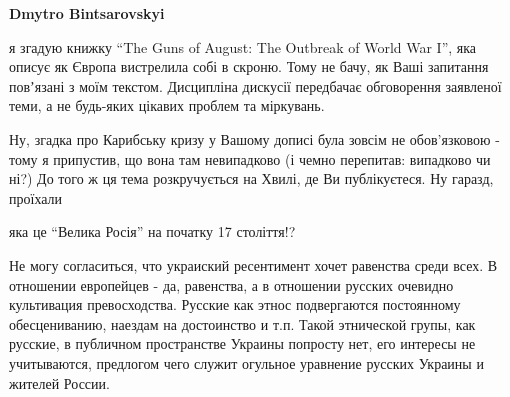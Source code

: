 \begin{itemize}
\begin{itemize} %
\textbf{Dmytro Bintsarovskyi} 

я згадую книжку \enquote{The Guns of August: The Outbreak of World War I}, яка описує
як Європа вистрелила собі в скроню. Тому не бачу, як Ваші запитання повʼязані з
моїм текстом. Дисципліна дискусії передбачає обговорення заявленої теми, а не
будь-яких цікавих проблем та міркувань.


Ну, згадка про Карибську кризу у Вашому дописі була зовсім не обов'язковою -
тому я припустив, що вона там невипадково (і чемно перепитав: випадково чи ні?)
До того ж ця тема розкручується на Хвилі, де Ви публікуєтеся. Ну гаразд,
проїхали

\end{itemize} %

яка це \enquote{Велика Росія} на початку 17 століття!?


Не могу согласиться, что украиский ресентимент хочет равенства среди всех. В
отношении европейцев - да, равенства, а в отношении русских очевидно
культивация превосходства. Русские как этнос подвергаются постоянному
обесцениванию, наездам на достоинство и т.п. Такой этнической групы, как
русские, в публичном пространстве Украины попросту нет, его интересы не
учитываются, предлогом чего служит огульное уравнение русских Украины и жителей
России.

\end{itemize} %

